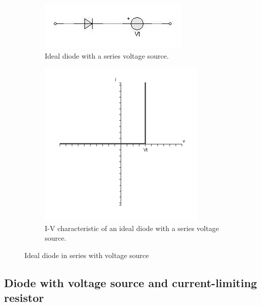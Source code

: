 \begin{figure}[H]
  \centering
  \begin{subfigure}{.4\textwidth}
    \centering
    \includegraphics[width=\linewidth]{figures/Diode_Modelling_Image6}
    \caption{Ideal diode with a series voltage source.}
  \end{subfigure}
  \begin{subfigure}{.4\textwidth}
    \centering
    \includegraphics[width=\linewidth]{figures/Diode_Modelling_Image8}
    \caption{I-V characteristic of an ideal diode with a series voltage source.}
  \end{subfigure}
  \caption{Ideal diode in series with voltage source}
\end{figure}

\subsection{Diode with voltage source and current-limiting resistor}

